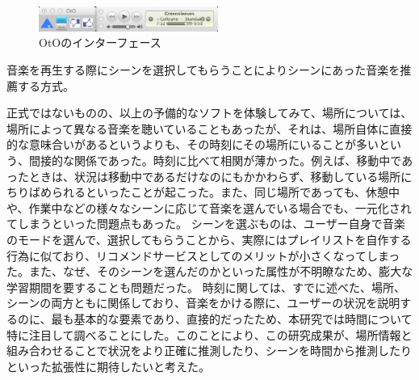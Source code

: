 \documentclass{jsarticle}
\begin{document}
\begin{enumerate}
\begin{figure}[h]
\begin{center}
\includegraphics[width=5.866cm]{OtO_imageView.jpg}
\caption{OtOのインターフェース}
\label{oto_interface}
\end{center}
\end{figure}




音楽を再生する際にシーンを選択してもらうことによりシーンにあった音楽を推薦する方式。
\end{enumerate}

正式ではないものの、以上の予備的なソフトを体験してみて、場所については、場所によって異なる音楽を聴いていることもあったが、それは、場所自体に直接的な意味合いがあるというよりも、その時刻にその場所にいることが多いという、間接的な関係であった。時刻に比べて相関が薄かった。例えば、移動中であったときは、状況は移動中であるだけなのにもかかわらず、移動している場所にちりばめられるといったことが起こった。また、同じ場所であっても、休憩中や、作業中などの様々なシーンに応じて音楽を選んでいる場合でも、一元化されてしまうといった問題点もあった。
シーンを選ぶものは、ユーザー自身で音楽のモードを選んで、選択してもらうことから、実際にはプレイリストを自作する行為に似ており、リコメンドサービスとしてのメリットが小さくなってしまった。また、なぜ、そのシーンを選んだのかといった属性が不明瞭なため、膨大な学習期間を要することも問題だった。
時刻に関しては、すでに述べた、場所、シーンの両方ともに関係しており、音楽をかける際に、ユーザーの状況を説明するのに、最も基本的な要素であり、直接的だったため、本研究では時間について特に注目して調べることにした。このことにより、この研究成果が、場所情報と組み合わせることで状況をより正確に推測したり、シーンを時間から推測したりといった拡張性に期待したいと考えた。
\end{document}
